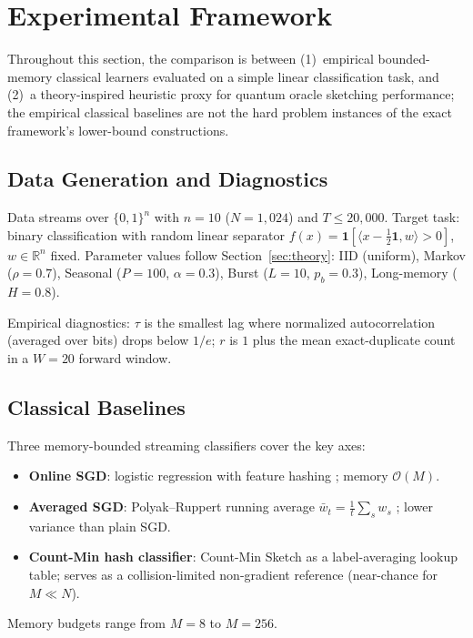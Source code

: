 \documentclass[preprint,12pt,authoryear]{elsarticle}
\newcommand{\R}{\mathbb{R}}
\newcommand{\bigO}{\mathcal{O}}
\begin{document}
\section{Experimental Framework}
\label{sec:experiments}

Throughout this section, the comparison is between (1)~empirical bounded-memory classical learners evaluated on a simple linear classification task, and (2)~a theory-inspired heuristic proxy for quantum oracle sketching performance; the empirical classical baselines are not the hard problem instances of the exact framework's lower-bound constructions.

\subsection{Data Generation and Diagnostics}

Data streams over $\{0,1\}^n$ with $n = 10$ ($N = 1{,}024$) and $T \leq 20{,}000$. Target task: binary classification with random linear separator $f(x) = \mathbf{1}[\langle x - \tfrac{1}{2}\mathbf{1}, w \rangle > 0]$, $w \in \R^n$ fixed. Parameter values follow Section~\ref{sec:theory}: IID (uniform), Markov ($\rho = 0.7$), Seasonal ($P = 100$, $\alpha = 0.3$), Burst ($L = 10$, $p_b = 0.3$), Long-memory ($H = 0.8$).

Empirical diagnostics: $\tau$ is the smallest lag where normalized autocorrelation (averaged over bits) drops below $1/e$; $r$ is $1$ plus the mean exact-duplicate count in a $W = 20$ forward window.

\subsection{Classical Baselines}

Three memory-bounded streaming classifiers cover the key axes:
\begin{itemize}
    \item \textbf{Online SGD}: logistic regression with feature hashing \citep{weinberger2009featurehashing, shalev2012online}; memory $\bigO(M)$.
    \item \textbf{Averaged SGD}: Polyak--Ruppert running average $\bar{w}_t = \frac{1}{t}\sum_s w_s$ \citep{polyak1992averaging}; lower variance than plain SGD.
    \item \textbf{Count-Min hash classifier}: Count-Min Sketch \citep{cormode2005improved} as a label-averaging lookup table; serves as a collision-limited non-gradient reference (near-chance for $M \ll N$).
\end{itemize}
Memory budgets range from $M = 8$ to $M = 256$.
\end{document}
